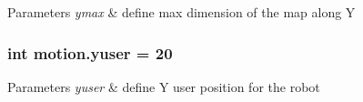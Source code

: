 \begin{DoxyParams}{Parameters}
{\em ymax} & define max dimension of the map along Y \\
\hline
\end{DoxyParams}
\subsubsection[{\texorpdfstring{yuser}{yuser}}]{\setlength{\rightskip}{0pt plus 5cm}int motion.\+yuser = 20}\hypertarget{namespacemotion_ae750031c9c1b1e4435481bee11eaf94e}{}\label{namespacemotion_ae750031c9c1b1e4435481bee11eaf94e}

\begin{DoxyParams}{Parameters}
{\em yuser} & define Y user position for the robot \\
\hline
\end{DoxyParams}
